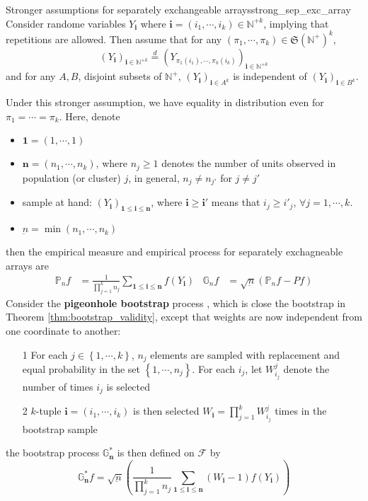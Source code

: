 \documentclass[twoside]{article}
\begin{document}
\begin{itemize}
    \begin{assumption}{Stronger assumptions for separately exchangeable arrays}{strong_sep_exc_array}
        Consider randome variables $Y_{\mathbf{i}}$ where $\mathbf{i}=\left(i_1,\cdots,i_k\right) \in \mathbb{N}^{+k}$, implying that repetitions are allowed. Then assume that for any $\left(\pi_1,\cdots,\pi_k\right)\in\mathfrak{S}\left(\mathbb{N}^+\right)^k$,
        $$ \left(Y_{\mathbf{i}}\right)_{\mathbf{i}\in\mathbb{N}^{+k}} \overset{d}{=} \left(Y_{\pi_1(i_1),\cdots,\pi_k(i_k)}\right)_{\mathbf{i}\in\mathbb{N}^{+k}} $$
        and for any $A,B$, disjoint subsets of $\mathbb{N}^+$, $\left(Y_{\mathbf{i}}\right)_{\mathbf{i}\in A^k}$ is independent of $\left(Y_{\mathbf{i}}\right)_{\mathbf{i}\in B^k}$.
    \end{assumption}
    Under this stronger assumption, we have equality in distribution even for $\pi_1 = \cdots =\pi_k$. Here, denote 
    \begin{itemize}
        \item $\mathbf{1} = \left(1,\cdots,1\right)$
        \item $\mathbf{n} = \left(n_1,\cdots,n_k\right)$, where $n_j\geq 1$ denotes the number of units observed in population (or cluster) $j$, in general, $n_j\neq n_{j'}$ for $j\neq j'$
        \item sample at hand: $\left(Y_{\mathbf{i}}\right)_{\mathbf{1\leq i\leq n}}$, where $\mathbf{i}\geq \mathbf{i}'$ means that $i_j\geq i'_j$, $\forall j=1,\cdots,k$.
        \item $\underbar{n} = \min\left(n_1,\cdots,n_k\right)$
    \end{itemize}
    then the empirical measure and empirical process for separately exchagneable arrays are 
    \begin{align*}
        \mathbb{P}_nf &=\frac{1}{\prod^k_{j=1}n_j}\sum_{\mathbf{1\leq i\leq n}}f(Y_{\mathbf{i}}) & \mathbb{G}_n f& = \sqrt{\underbar{n}}\left(\mathbb{P}_n f-Pf\right)
    \end{align*}
    Consider the \textbf{pigeonhole bootstrap} process \citep{mccullagh2000resampling}, which is close the bootstrap in Theorem \ref{thm:bootstrap_validity}, except that weights are now independent from one coordinate to another:
    \begin{itemize}
        \item[1] For each $j\in \left\{1,\cdots,k\right\}$, $n_j$ elements are sampled with replacement and equal probability in the set $\left\{1,\cdots,n_j\right\}$. For each $i_j$, let $W_{i_j}^j$ denote the number of times $i_j$ is selected 
        \item[2] $k$-tuple $\mathbf{i}=\left(i_1,\cdots,i_k\right)$ is then selected $W_{\mathbf{i}}= \prod^k_{j=1} W_{i_j}^j$ times in the bootstrap sample 
    \end{itemize}
    the bootstrap process $\mathbb{G}^*_{\mathbf{n}}$ is then defined on $\mathcal{F}$ by 
    \begin{equation*}
        \mathbb{G}^*_{\mathbf{n}} f = \sqrt{\underbar{n}} \left(\frac{1}{\prod^k_{j=1}n_j} \sum_{\mathbf{1\leq i\leq n}}\left(W_{\mathbf{i}}-1\right) f(Y_{\mathbf{i}}) \right)
    \end{equation*}
\end{itemize}


\newpage


\end{document}
